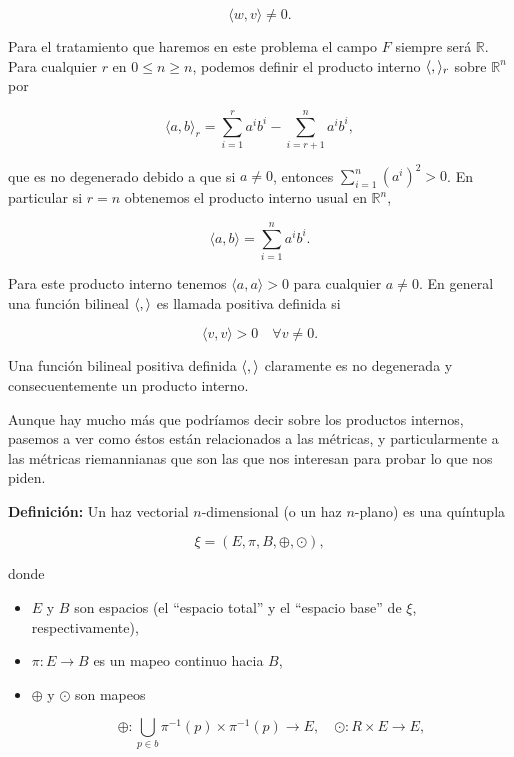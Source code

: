 \documentclass[a4paper,10pt]{article}
\numberwithin{equation}{section}
\newcommand{\definicion}{\textbf{Definición: }}
\begin{document}
\begin{equation}
 \langle w, v \rangle \ne 0.
\end{equation}

Para el tratamiento que haremos en este problema el campo $F$ siempre será $\mathbb{R}$. Para 
cualquier $r$ en $0 \leq n \geq n$, podemos definir el producto interno 
$\langle \space , \space \rangle_r$ sobre $\mathbb{R}^n$ por 

\begin{equation}
 \langle a, b \rangle_r = \sum_{i=1}^r a^ib^i - \sum_{i=r+1}^n a^ib^i,
\end{equation}

que es no degenerado debido a que si $a \ne 0$, entonces $\sum_{i=1}^n (a^i)^2 > 0$. 
En particular si $r = n$ obtenemos el producto interno usual en $\mathbb{R}^n$,

\begin{equation}
 \langle a, b \rangle = \sum_{i=1}^n a^ib^i.
\end{equation}

Para este producto interno tenemos $\langle a, a \rangle > 0$ para cualquier 
$a \ne 0$. En general una función bilineal $\langle \space, \space \rangle$ es 
llamada positiva definida si 

\begin{equation}
 \langle v, v \rangle > 0 \quad \forall v \ne 0.
\end{equation}

Una función bilineal positiva definida $\langle \space, \space \rangle$
claramente es no degenerada y consecuentemente un producto interno. 

\vspace{.3cm}

Aunque hay mucho más que podríamos decir sobre los productos internos, 
pasemos a ver como éstos están relacionados a las métricas, y particularmente 
a las métricas riemannianas que son las que nos interesan para probar lo que
nos piden. 

\vspace{.3cm}

\definicion Un haz vectorial $n$-dimensional (o un haz $n$-plano)
es una quíntupla 

\begin{equation}
 \xi = (E,\pi,B,\oplus,\odot),
\end{equation}

donde 

\begin{itemize}
 \item $E$ y $B$ son espacios (el ``espacio total'' y el ``espacio base'' de 
 $\xi$, respectivamente),
 \item $\pi: E \rightarrow B$ es un mapeo continuo hacia $B$,
 \item $\oplus$ y $\odot$ son mapeos
 
 \begin{equation}
  \oplus: \underset{p \in b}{\bigcup} \pi^{-1}(p) \times \pi^{-1}(p) \rightarrow E, \quad 
  \odot: R \times E \rightarrow E,
 \end{equation}
\end{itemize}
\end{document}
